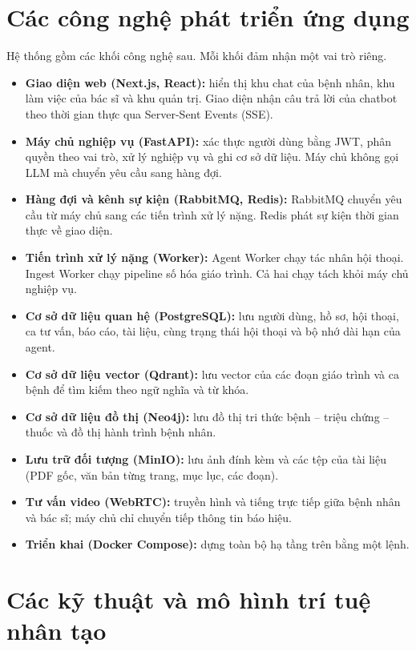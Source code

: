 \section{Các công nghệ phát triển ứng dụng}

Hệ thống gồm các khối công nghệ sau. Mỗi khối đảm nhận một vai trò riêng.

\begin{itemize}
  \item \textbf{Giao diện web (Next.js, React):} hiển thị khu chat của bệnh nhân, khu làm việc của bác sĩ và khu quản trị. Giao diện nhận câu trả lời của chatbot theo thời gian thực qua Server-Sent Events (SSE).
  \item \textbf{Máy chủ nghiệp vụ (FastAPI):} xác thực người dùng bằng JWT, phân quyền theo vai trò, xử lý nghiệp vụ và ghi cơ sở dữ liệu. Máy chủ không gọi LLM mà chuyển yêu cầu sang hàng đợi.
  \item \textbf{Hàng đợi và kênh sự kiện (RabbitMQ, Redis):} RabbitMQ chuyển yêu cầu từ máy chủ sang các tiến trình xử lý nặng. Redis phát sự kiện thời gian thực về giao diện.
  \item \textbf{Tiến trình xử lý nặng (Worker):} Agent Worker chạy tác nhân hội thoại. Ingest Worker chạy pipeline số hóa giáo trình. Cả hai chạy tách khỏi máy chủ nghiệp vụ.
  \item \textbf{Cơ sở dữ liệu quan hệ (PostgreSQL):} lưu người dùng, hồ sơ, hội thoại, ca tư vấn, báo cáo, tài liệu, cùng trạng thái hội thoại và bộ nhớ dài hạn của agent.
  \item \textbf{Cơ sở dữ liệu vector (Qdrant):} lưu vector của các đoạn giáo trình và ca bệnh để tìm kiếm theo ngữ nghĩa và từ khóa.
  \item \textbf{Cơ sở dữ liệu đồ thị (Neo4j):} lưu đồ thị tri thức bệnh -- triệu chứng -- thuốc và đồ thị hành trình bệnh nhân.
  \item \textbf{Lưu trữ đối tượng (MinIO):} lưu ảnh đính kèm và các tệp của tài liệu (PDF gốc, văn bản từng trang, mục lục, các đoạn).
  \item \textbf{Tư vấn video (WebRTC):} truyền hình và tiếng trực tiếp giữa bệnh nhân và bác sĩ; máy chủ chỉ chuyển tiếp thông tin báo hiệu.
  \item \textbf{Triển khai (Docker Compose):} dựng toàn bộ hạ tầng trên bằng một lệnh.
\end{itemize}

\section{Các kỹ thuật và mô hình trí tuệ nhân tạo}

